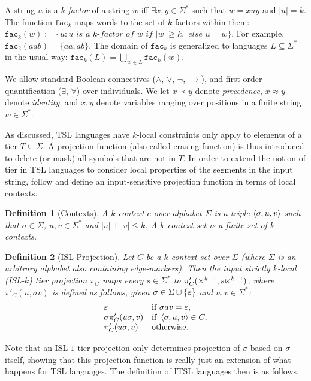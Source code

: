 \documentclass[11pt,a4paper]{article}
\newcommand{\facn}[1]{\ensuremath{\texttt{fac}_{#1}}}
\newtheorem{definition}{Definition}
\begin{document}
A string $u$ is a $k$-\emph{factor} of a string $w$ iff $\exists x, y \in \Sigma^*$ such that $w=xuy$ and $|u| = k$. 
The function $\facn{k}$ maps words to the set of $k$-factors within them: $\facn{k}(w) := \{ u : u \textit{ is a $k$-factor of } w \textit{ if } |w| \geq k, \textit{ else } u = w\}$.
For example, $\facn{2}(aab) = \{ aa, ab\}$.
%
The domain of $\facn{k}$ is generalized to languages $L \subseteq \Sigma^*$ in the usual way: $\facn{k}(L) = \bigcup_{w \in L} \facn{k}(w)$.

We allow standard Boolean connectives ($\wedge$, $\vee$, $\neg$, $\rightarrow $), and first-order quantification ($\exists$, $\forall $) over individuals. 
We let $x \prec y$ denote \emph{precedence}, $x \approx y$ denote \emph{identity}, and $x, y$ denote variables ranging over positions in a finite string $w \in \Sigma^*$. 

As discussed, TSL languages  have $k$-local constraints only apply to elements of a tier $T \subseteq \Sigma$.
A projection function (also called erasing function) is thus introduced to delete (or mask) all symbols that are not in $T$.
In order to extend the notion of tier in TSL languages to consider local properties of the segments in the input string, \citet{desanto2019structure} follow \cite{ChandleeHeinz18} and define an input-sensitive projection function in terms of local contexts.
%
\begin{definition}[Contexts]
    A \emph{$k$-context} $c$ over alphabet $\Sigma$ is a triple $\left \langle \sigma, u, v \right \rangle $ such that $\sigma \in \Sigma$, $u, v \in \Sigma^*$ and $|u| + |v| \leq k$.
    A \emph{$k$-context set} is a finite set of $k$-contexts.
\end{definition}
%
\begin{definition}[ISL Projection]
    Let $C$ be a $k$-context set over $\Sigma$ (where $\Sigma$ is an arbitrary alphabet also containing edge-markers).
    Then the \emph{input strictly $k$-local} (ISL-$k$) tier projection $\pi_C$ maps every $s \in \Sigma^*$ to $\pi'_C(\rtimes^{k-1}, s\ltimes^{k-1})$, where $\pi'_C(u, \sigma v)$ is defined as follows, given $\sigma \in \Sigma \cup \left \{ \varepsilon \right \}$ and $u,v \in \Sigma^*$:
    \[
    \begin{array}{ll}
        \varepsilon & \text{if } \sigma a v = \varepsilon,\\
        \sigma \pi'_C(u\sigma, v) & \text{if } \left \langle \sigma, u, v \right \rangle  \in C,\\
        \pi'_C(u\sigma, v) & \text{otherwise.}
    \end{array}
    \]
\end{definition}
Note that an ISL-$1$ tier projection only determines projection of $\sigma$ based on $\sigma$ itself, showing that this projection function is really just an extension of what happens for TSL languages\@.
The definition of ITSL languages then  is as follows\@.
\end{document}
